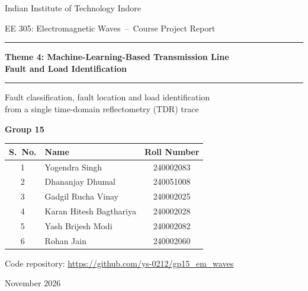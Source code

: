 \documentclass[11pt,a4paper]{article}
\begin{document}
\begin{titlepage}
\centering
\vspace*{1.2cm}
{\large Indian Institute of Technology Indore\par}
\vspace{0.4cm}
{\large EE 305: Electromagnetic Waves \,--\, Course Project Report\par}
\vspace{2.2cm}
{\color{accent}\rule{\textwidth}{1pt}\par}
\vspace{0.5cm}
{\LARGE\bfseries Theme 4: Machine-Learning-Based Transmission Line\\[0.25em] Fault and Load Identification\par}
\vspace{0.5cm}
{\color{accent}\rule{\textwidth}{1pt}\par}
\vspace{0.6cm}
{\large Fault classification, fault location and load identification\\ from a single time-domain reflectometry (TDR) trace\par}
\vspace{2.2cm}
{\Large\bfseries Group 15\par}
\vspace{0.7cm}
\renewcommand{\arraystretch}{1.35}
\begin{tabular}{c l c}
\toprule
\textbf{S.\ No.} & \textbf{Name} & \textbf{Roll Number} \\
\midrule
1 & Yogendra Singh & 240002083 \\
2 & Dhananjay Dhumal & 240051008 \\
3 & Gadgil Rucha Vinay & 240002025 \\
4 & Karan Hitesh Bagthariya & 240002028 \\
5 & Yash Brijesh Modi & 240002082 \\
6 & Rohan Jain & 240002060 \\
\bottomrule
\end{tabular}
\vfill
{\normalsize Code repository: \url{https://github.com/ys-0212/gp15_em_waves}\par}
\vspace{0.4cm}
{\large November 2026\par}
\end{titlepage}

\thispagestyle{fancy}
\tableofcontents
\newpage
\end{document}
